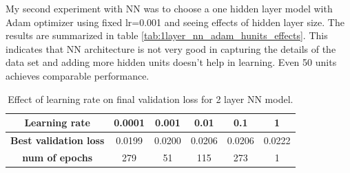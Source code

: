 \documentclass[11pt]{article}
\begin{document}
My second experiment with NN was to choose a one hidden layer model with Adam optimizer using fixed lr=0.001 and seeing effects of hidden layer size. The results are summarized in table \ref{tab:1layer_nn_adam_hunits_effects}. This indicates that NN architecture is not very good in capturing the details of the data set and adding more hidden units doesn't help in learning. Even 50 units achieves comparable performance. \\
 
\begin{table}[h!]
	\begin{center}
		\begin{tabular}{c|c|c|c|c|c} %
			\textbf{Learning rate} & 0.0001 & \bf0.001 & 0.01 & 0.1 & 1\\
			\hline
			\textbf{Best validation loss} & 0.0199 & 0.0200 & 0.0206 & 0.0206 & 0.0222\\
			\hline
			\textbf{num of epochs} & 279 & 51 & 115 & 273 & 1
		\end{tabular}
		\caption{Effect of learning rate on final validation loss for 2 layer NN model.}
		\label{tab:2layer_nn_adam_lr_effects}
	\end{center}
\end{table}
\end{document}
